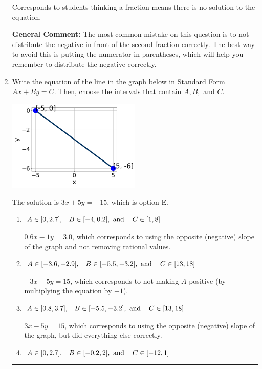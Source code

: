 \documentclass{extbook}[14pt]
\newcommand{\litem}[1]{\item #1

\rule{\textwidth}{0.4pt}}
\begin{document}
\begin{enumerate}
{\begin{enumerate}[label=\Alph*.]
Corresponds to students thinking a fraction means there is no solution to the equation.
\end{enumerate}

\textbf{General Comment:} The most common mistake on this question is to not distribute the negative in front of the second fraction correctly. The best way to avoid this is putting the numerator in parentheses, which will help you remember to distribute the negative correctly.
}
\litem{
Write the equation of the line in the graph below in Standard Form $Ax+By=C$. Then, choose the intervals that contain $A, B, \text{ and } C$.

\begin{center}
    \includegraphics[width=0.5\textwidth]{../Figures/linearGraphToStandardCopyC.png}
\end{center}


The solution is \( 3x + 5y = -15 \), which is option E.\begin{enumerate}[label=\Alph*.]
\item \( A \in [0, 2.7], \hspace{3mm} B \in [-4, 0.2], \text{ and } \hspace{3mm} C \in [1, 8] \)

 $0.6x - 1y = 3.0$, which corresponds to using the opposite (negative) slope of the graph and not removing rational values.
\item \( A \in [-3.6, -2.9], \hspace{3mm} B \in [-5.5, -3.2], \text{ and } \hspace{3mm} C \in [13, 18] \)

 $-3x - 5y = 15$, which corresponds to not making $A$ positive (by multiplying the equation by $-1$).
\item \( A \in [0.8, 3.7], \hspace{3mm} B \in [-5.5, -3.2], \text{ and } \hspace{3mm} C \in [13, 18] \)

 $3x - 5y = 15$, which corresponds to using the opposite (negative) slope of the graph, but did everything else correctly.
\item \( A \in [0, 2.7], \hspace{3mm} B \in [-0.2, 2], \text{ and } \hspace{3mm} C \in [-12, 1] \)


\end{enumerate}}
\end{enumerate}
\end{document}
